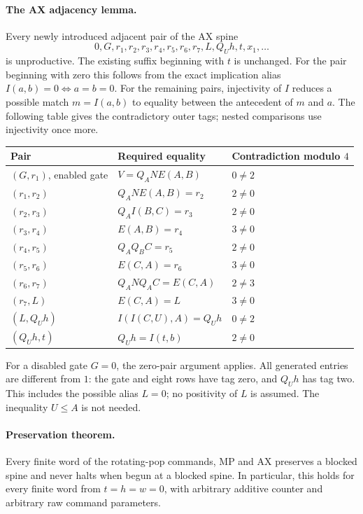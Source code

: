 \paragraph{The AX adjacency lemma.}
Every newly introduced adjacent pair of the AX spine
\[
 0,G,r_1,r_2,r_3,r_4,r_5,r_6,r_7,L,Q_Uh,t,x_1,\ldots
\]
is unproductive. The existing suffix beginning with $t$ is unchanged.
For the pair beginning with zero this follows from the exact implication
alias $I(a,b)=0\Longleftrightarrow a=b=0$. For the remaining pairs,
injectivity of $I$ reduces a possible match $m=I(a,b)$ to equality
between the antecedent of $m$ and $a$. The following table gives the
contradictory outer tags; nested comparisons use injectivity once more.

\begin{center}\small
\begin{tabular}{lll}
\toprule
Pair & Required equality & Contradiction modulo $4$\\
\midrule
$(G,r_1)$, enabled gate & $V=Q_A N E(A,B)$ & $0\ne2$\\
$(r_1,r_2)$ & $Q_A N E(A,B)=r_2$ & $2\ne0$\\
$(r_2,r_3)$ & $Q_A I(B,C)=r_3$ & $2\ne0$\\
$(r_3,r_4)$ & $E(A,B)=r_4$ & $3\ne0$\\
$(r_4,r_5)$ & $Q_AQ_BC=r_5$ & $2\ne0$\\
$(r_5,r_6)$ & $E(C,A)=r_6$ & $3\ne0$\\
$(r_6,r_7)$ & $Q_A N Q_AC=E(C,A)$ & $2\ne3$\\
$(r_7,L)$ & $E(C,A)=L$ & $3\ne0$\\
$(L,Q_Uh)$ & $I(I(C,U),A)=Q_Uh$ & $0\ne2$\\
$(Q_Uh,t)$ & $Q_Uh=I(t,b)$ & $2\ne0$\\
\bottomrule
\end{tabular}
\end{center}
For a disabled gate $G=0$, the zero-pair argument applies. All generated
entries are different from $1$: the gate and eight rows have tag zero,
and $Q_Uh$ has tag two. This includes the possible alias $L=0$; no
positivity of $L$ is assumed. The inequality $U\le A$ is not needed.

\paragraph{Preservation theorem.}
Every finite word of the rotating-pop commands, MP and AX preserves a
blocked spine and never halts when begun at a blocked spine. In
particular, this holds for every finite word from $t=h=w=0$, with
arbitrary additive counter and arbitrary raw command parameters.


